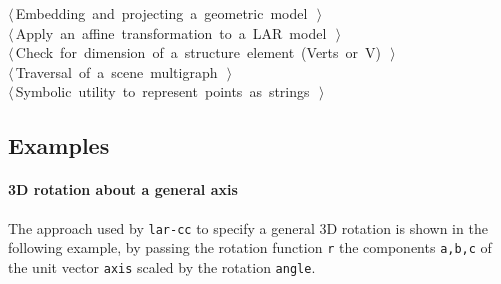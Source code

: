 \documentclass[11pt,oneside]{article}	%
\begin{document}
\begin{flushleft}
\begin{list}{}{}
\mbox{}\verb@@\hbox{$\langle\,$Embedding and projecting a geometric model\nobreak\ {\footnotesize {}}$\,\rangle$}\verb@@\\
\mbox{}\verb@@\hbox{$\langle\,$Apply an affine transformation to a LAR model\nobreak\ {\footnotesize {}}$\,\rangle$}\verb@@\\
\mbox{}\verb@@\hbox{$\langle\,$Check for dimension of a structure element (Verts or V)\nobreak\ {\footnotesize {}}$\,\rangle$}\verb@@\\
\mbox{}\verb@@\hbox{$\langle\,$Traversal of a scene multigraph\nobreak\ {\footnotesize {}}$\,\rangle$}\verb@@\\
\mbox{}\verb@@\hbox{$\langle\,$Symbolic utility to represent points as strings\nobreak\ {\footnotesize {}}$\,\rangle$}\verb@@\\
\mbox{}\verb@@{\NWsep}
\end{list}
\vspace{-2ex}
\end{flushleft}
\subsection{Examples}

\paragraph{3D rotation about a general axis}
The approach used by \texttt{lar-cc} to specify a general 3D rotation is shown in the following example,
by passing the rotation function \texttt{r} the components \texttt{a,b,c} of the unit vector \texttt{axis} scaled by the rotation \texttt{angle}. 
\end{document}
